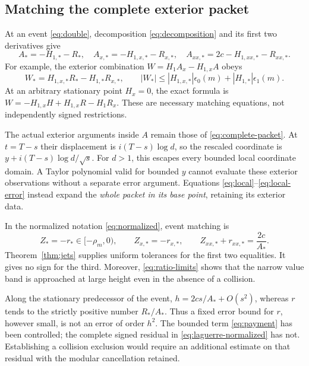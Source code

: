\subsection{Matching the complete exterior packet}

At an event \eqref{eq:double}, decomposition \eqref{eq:decomposition}
and its first two derivatives give
\begin{equation}\label{eq:event-matching}
 A_*=-H_{1,*}-R_*,\quad
 A_{x,*}=-H_{1,x,*}-R_{x,*},\quad
 A_{xx,*}=2c-H_{1,xx,*}-R_{xx,*}.
\end{equation}
For example, the exterior combination $W=H_1A_x-H_{1,x}A$ obeys
\[
 W_*=H_{1,x,*}R_*-H_{1,*}R_{x,*},\qquad
 |W_*|\le |H_{1,x,*}|\epsilon_0(m)+|H_{1,*}|\epsilon_1(m).
\]
At an arbitrary stationary point $H_x=0$, the exact formula is
$W=-H_{1,x}H+H_{1,x}R-H_1R_x$. These are necessary matching equations,
not independently signed restrictions.

The actual exterior arguments inside $A$ remain those of
\eqref{eq:complete-packet}. At $t=T-s$ their displacement is
$i(T-s)\log d$, so the rescaled coordinate is
$y+i(T-s)\log d/\sqrt{s}$. For $d>1$, this escapes every bounded local
coordinate domain. A Taylor polynomial valid for bounded $y$ cannot
evaluate these exterior observations without a separate error argument.
Equations \eqref{eq:local}--\eqref{eq:local-error} instead expand the
\emph{whole packet in its base point}, retaining its exterior data.

In the normalized notation \eqref{eq:normalized}, event matching is
\begin{equation}\label{eq:normalized-matching}
 Z_*=-r_*\in[-\rho_m,0),\qquad
 Z_{x,*}=-r_{x,*},\qquad
 Z_{xx,*}+r_{xx,*}=\frac{2c}{A_*}.
\end{equation}
Theorem~\ref{thm:jets} supplies uniform tolerances for the first two
equalities. It gives no sign for the third. Moreover,
\eqref{eq:ratio-limits} shows that the narrow value band is approached at
large height even in the absence of a collision.

Along the stationary predecessor of the event,
$h=2cs/A_*+O(s^2)$, whereas $r$ tends to the strictly positive number
$R_*/A_*$. Thus a fixed error bound for $r$, however small, is not an
error of order $h^2$. The bounded term \eqref{eq:payment} has been
controlled; the complete signed residual in \eqref{eq:laguerre-normalized}
has not. Establishing a collision exclusion would require an additional
estimate on that residual with the modular cancellation retained.
